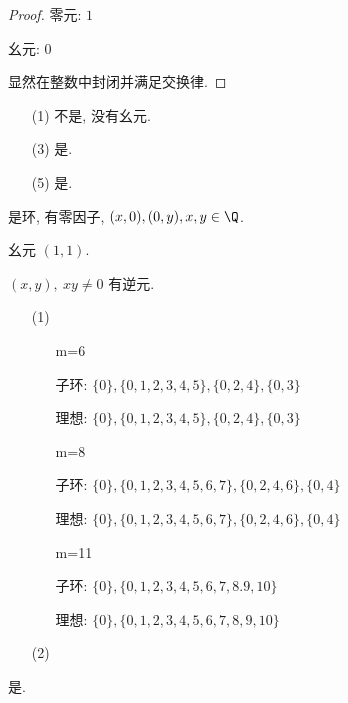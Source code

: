\problem[习题六 59]

\begin{proof}
	零元: $1$

	幺元: $0$

	显然在整数中封闭并满足交换律.
\end{proof}

\problem[习题六 60(1,3,5)]

\begin{itemize}
	\item[(1)]不是, 没有幺元.
	\item[(3)]是.
	\item[(5)]是.
\end{itemize}

\problem[习题六 62]

\begin{solution}
	是环, 有零因子, $(x,0),(0,y),x,y\in \Q$.

	幺元 $(1,1)$.

	$(x,y),\ xy\neq 0$ 有逆元.
\end{solution}

\problem[习题六 65]

\begin{solution}
	\begin{itemize}
		\item[(1)]\

		\begin{itemize}
			\item[m=6]\

			子环: $\{0\},\{0,1,2,3,4,5\},\{0,2,4\},\{0,3\}$

			理想: $\{0\},\{0,1,2,3,4,5\},\{0,2,4\},\{0,3\}$
			\item[m=8]\

			子环: $\{0\},\{0,1,2,3,4,5,6,7\},\{0,2,4,6\},\{0,4\}$

			理想: $\{0\},\{0,1,2,3,4,5,6,7\},\{0,2,4,6\},\{0,4\}$
			\item[m=11]\

			子环: $\{0\},\{0,1,2,3,4,5,6,7,8.9,10\}$

			理想: $\{0\},\{0,1,2,3,4,5,6,7,8,9,10\}$
		\end{itemize}
		\item[(2)]
	\end{itemize}
\end{solution}

\problem[习题六 68(2)(4)]

是.

\problem[习题六 69]


